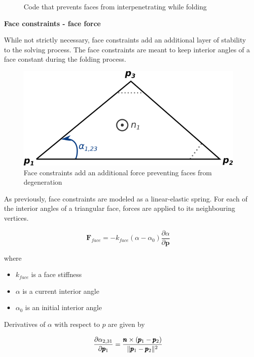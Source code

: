 \begin{figure}[H]
	\caption{Code that prevents faces from interpenetrating while folding}
	
\end{figure}

\medskip
\textbf{Face constraints - face force}
\smallskip

While not strictly necessary, face constraints add an additional layer of stability to the 
solving process. The face constraints are meant to keep interior angles of a face
constant during the folding process.

\begin{figure}[H]
	\caption{Face constraints add an additional force preventing faces from degeneration}
    \centering
	\includegraphics[width=.6\linewidth]{assets/3-face_force_face.png}
\end{figure}

As previously, face constraints are modeled as a linear-elastic spring.
For each of the interior angles of a triangular face, forces are applied to its neighbouring vertices.

\begin{equation} \label{Solver:face_force}
	\pmb{F}_{face} = -k_{face}(\alpha - \alpha _0)\frac{\partial \alpha}{\partial \pmb{p}}
\end{equation}

where

\begin{itemize}
	\item $k_{face}$ is a face stiffness
	\item $\alpha$ is a current interior angle
	\item $\alpha _0$ is an initial interior angle
\end{itemize}

Derivatives of $\alpha$ with respect to $p$ are given by

\begin{equation} \label{Solver:face_force1}
	\frac{\partial \alpha _{2,31}}{\partial \pmb{p}_1} = \frac{\pmb{n} \times (\pmb{p}_1 - \pmb{p}_2)}{\|\pmb{p}_1 - \pmb{p}_2\|^2}
\end{equation}

